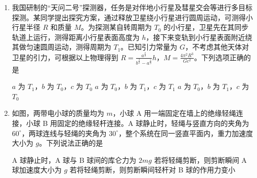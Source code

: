 \documentclass[\gkver]{gaokaozhenti}
\begin{document}
\begin{enumerate}
{故选 D。
}

\item
我国研制的“天问二号”探测器，任务是对伴地小行星及彗星交会等进行多目标探测。某同学提出探究方案，通过释放卫星绕小行星进行圆周运动，可测得小行星半径 $R$ 和质量 $M$。为探测某自转周期为 $T_{0}$ 的小行星，卫星先在其同步轨道上运行，测得距离小行星表面高度为 $h$，接下来变轨到小行星表面附近绕其做匀速圆周运动，测得周期为 $T_{1}$。已知引力常量为 $G$，不考虑其他天体对卫星的引力，可根据以上物理得到 $R=\frac{a^{\frac{2}{3}}}{b^{\frac{2}{3}}-a^{\frac{2}{3}}}h$，$M=\frac{4\pi^{2}R^{3}}{Gc^{2}}$。下列选项正确的是

{$a$ 为 $T_{1}$，$b$ 为 $T_{0}$，$c$ 为 $T_{0}$}
{$a$ 为 $T_{0}$，$b$ 为 $T_{1}$，$c$ 为 $T_{1}$}
{$a$ 为 $T_{0}$，$b$ 为 $T_{1}$，$c$ 为 $T_{0}$}


\item
如图，两带电小球的质量均为 $m$，小球 A 用一端固定在墙上的绝缘轻绳连接，小球 B 用固定的绝缘轻杆连接。A 球静止时，轻绳与竖直方向的夹角为 $60^{\circ}$，两球连线与轻绳的夹角为 $30^{\circ}$，整个系统在同一竖直平面内，重力加速度大小为 $g$。下列说法正确的是


{A 球静止时，A 球与 B 球间的库仑力为 $2mg$}
{若将轻绳剪断，则剪断瞬间 A 球加速度大小为 $g$}
{若将轻绳剪断，则剪断瞬间轻杆对 B 球的作用力变小}


\end{enumerate}
\end{document}
